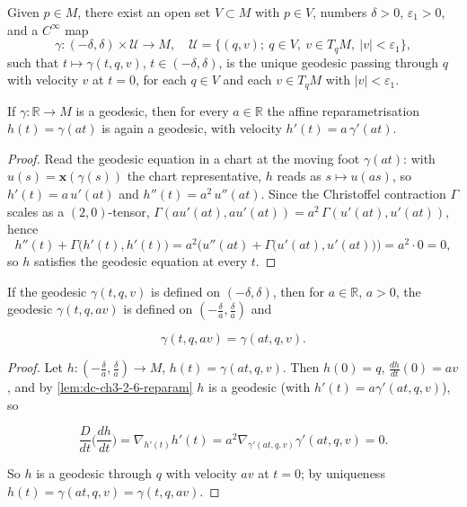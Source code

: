 \begin{proposition}
  \label{prop:dc-ch3-2-5}
  Given $p\in M$, there exist an open set $V\subset M$ with $p\in V$, numbers
  $\delta>0$, $\varepsilon_1>0$, and a $C^\infty$ map
  $$
  \gamma:(-\delta,\delta)\times\mathcal{U}\to M,\quad\mathcal{U}=\{(q,v);\ q\in V,\ v\in T_qM,\ |v|<\varepsilon_1\},
  $$
  such that $t\mapsto\gamma(t,q,v)$, $t\in(-\delta,\delta)$, is the unique geodesic
  passing through $q$ with velocity $v$ at $t=0$, for each $q\in V$ and each
  $v\in T_qM$ with $|v|<\varepsilon_1$.
\end{proposition}

\begin{lemma}
  \label{lem:dc-ch3-2-6-reparam}
  \leanok
  If $\gamma:\mathbb{R}\to M$ is a geodesic, then for every $a\in\mathbb{R}$ the
  affine reparametrisation $h(t)=\gamma(at)$ is again a geodesic, with velocity
  $h'(t)=a\,\gamma'(at)$.
\end{lemma}
\begin{proof}
  \sketch
  \leanok
  Read the geodesic equation in a chart at the moving foot $\gamma(at)$: with
  $u(s)=\mathbf{x}(\gamma(s))$ the chart representative, $h$ reads as $s\mapsto
  u(as)$, so $h'(t)=a\,u'(at)$ and $h''(t)=a^2\,u''(at)$. Since the Christoffel
  contraction $\Gamma$ scales as a $(2,0)$-tensor,
  $\Gamma(au'(at),au'(at))=a^2\,\Gamma(u'(at),u'(at))$, hence
  $$
  h''(t)+\Gamma\big(h'(t),h'(t)\big)
    =a^2\Big(u''(at)+\Gamma\big(u'(at),u'(at)\big)\Big)=a^2\cdot 0=0,
  $$
  so $h$ satisfies the geodesic equation at every $t$.
\end{proof}

\begin{lemma}
  \label{lem:dc-ch3-2-6}
  \leanok
  If the geodesic $\gamma(t,q,v)$ is defined on $(-\delta,\delta)$, then for
  $a\in\mathbb{R}$, $a>0$, the geodesic $\gamma(t,q,av)$ is defined on
  $(-\frac{\delta}{a},\frac{\delta}{a})$ and

  $$
  \gamma(t,q,av)=\gamma(at,q,v).
  $$
\end{lemma}
\begin{proof}
  \sketch
  \leanok
  Let $h:(-\frac{\delta}{a},\frac{\delta}{a})\to M$, $h(t)=\gamma(at,q,v)$.
  Then $h(0)=q$, $\frac{dh}{dt}(0)=av$, and by \cref{lem:dc-ch3-2-6-reparam}
  $h$ is a geodesic (with $h'(t)=a\gamma'(at,q,v)$), so

  $$
  \frac{D}{dt}\Big(\frac{dh}{dt}\Big)=\nabla_{h'(t)}h'(t)=a^2\nabla_{\gamma'(at,q,v)}\gamma'(at,q,v)=0.
  $$

  So $h$ is a geodesic through $q$ with velocity $av$ at $t=0$; by uniqueness
  $h(t)=\gamma(at,q,v)=\gamma(t,q,av)$.
\end{proof}

